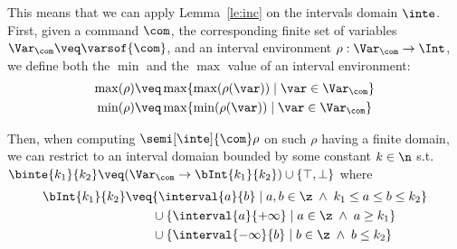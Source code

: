 

 


This means that we can apply Lemma~\ref{le:inc} on the intervals
domain \(\inte\).  First, given a command \(\com\), the corresponding
finite set of variables \(\Var_{\com} \veq \varsof{\com}\), and an
interval environment \(\rho : \Var_{\com} \to \Int\), we define both
the \(\min\) and the \(\max\) value of an interval environment:
\begin{align*}
\max(\rho) & \veq \max \{ \max(\rho(\var)) \mid \var \in \Var_{\com}\} \\
\min(\rho) & \veq \max \{ \min(\rho(\var)) \mid \var \in \Var_{\com}\}
\end{align*}

% 
Then, when computing \(\semi[\inte]{\com} \rho\) on such \(\rho\)
having a finite domain, we can restrict to an interval domaian bounded
by some constant \(k\in\n\) s.t.
\(\binte{k_1}{k_2} \veq (\Var_{\com} \to \bInt{k_1}{k_2}) \cup \{\top, \bot\}\)
where
\begin{align*}
  \bInt{k_1}{k_2} & \veq \{ \interval{a}{b} \mid a, b \in \z \; \land \; k_1 \leq a \leq b \leq k_2\} \\
                  & \phantom{\veq} \cup \{\interval{a}{+\infty} \mid a \in \z \; \land \; a \geq k_1\} \\
                  & \phantom{\veq} \cup \{\interval{-\infty}{b} \mid b \in \z \; \land \; b \leq k_2\}
\end{align*}

